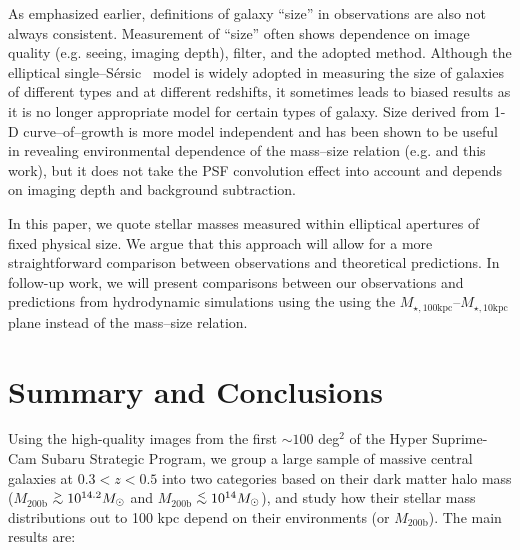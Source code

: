 \documentclass[a4paper,fleqn,usenatbib]{mnras}
\def\simlt{\lower.5ex\hbox{$\; \buildrel < \over {\sim} \;$}}
\def\simgt{\lower.5ex\hbox{$\; \buildrel > \over {\sim} \;$}}
\def\ser{{S\'{e}rsic\ }}
\def\mhalo{{$M_{\mathrm{200b}}$}}
\def\minn{{$M_{\star,10\mathrm{kpc}}$}}
\def\mtot{{$M_{\star,100\mathrm{kpc}}$}}
\begin{document}
    As emphasized earlier, definitions of galaxy ``size'' in observations are also not 
    always consistent. 
    Measurement of ``size'' often shows dependence on image quality (e.g. seeing, 
    imaging depth), filter, and the adopted method. 
    Although the elliptical single--\ser{} model is widely adopted in measuring the 
    size of galaxies of different types and at different redshifts, it sometimes leads
    to biased results as it is no longer appropriate model for certain types of galaxy. 
    Size derived from 1-D curve--of--growth is more model independent and has been 
    shown to be useful in revealing environmental dependence of the mass--size relation 
    (e.g. \citealt{Yoon2017} and this work), but it does not take the PSF convolution 
    effect into account and depends on imaging depth and background subtraction.

    In this paper, we quote stellar masses measured within elliptical apertures of 
    fixed physical size. 
    We argue that this approach will allow for a more straightforward comparison 
    between observations and theoretical predictions. 
    In follow-up work, we will present comparisons between our observations and 
    predictions from hydrodynamic simulations using the using the \mtot{}--\minn{} 
    plane instead of the mass--size relation. 
          


\section{Summary and Conclusions}
    \label{sec:summary}
    
    Using the high-quality images from the first $\sim100$ deg$^2$ of the 
    Hyper Suprime-Cam Subaru Strategic Program, we group a large sample of massive 
    central galaxies at $0.3 < z < 0.5$ into two categories based on their dark matter
    halo mass (\mhalo{}$\simgt 10^{14.2} M_{\odot}$ and 
    \mhalo{}$\simlt 10^{14} M_{\odot}$), and study how their stellar mass distributions 
    out to 100 kpc depend on their environments (or \mhalo{}). 
    The main results are:  
    
\end{document}
